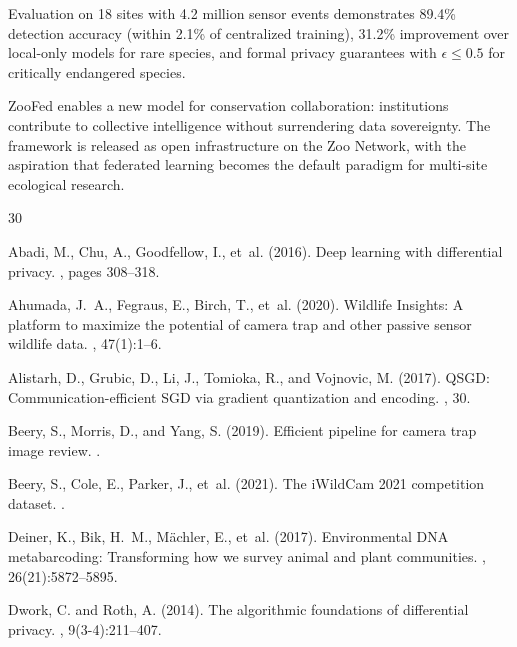 \documentclass[11pt,a4paper]{article}
\begin{document}
Evaluation on 18 sites with 4.2 million sensor events demonstrates 89.4\% detection accuracy (within 2.1\% of centralized training), 31.2\% improvement over local-only models for rare species, and formal privacy guarantees with $\epsilon \leq 0.5$ for critically endangered species.

ZooFed enables a new model for conservation collaboration: institutions contribute to collective intelligence without surrendering data sovereignty.
The framework is released as open infrastructure on the Zoo Network, with the aspiration that federated learning becomes the default paradigm for multi-site ecological research.

\begin{thebibliography}{30}

Abadi, M., Chu, A., Goodfellow, I., et~al. (2016).
\newblock Deep learning with differential privacy.
, pages 308--318.

Ahumada, J.~A., Fegraus, E., Birch, T., et~al. (2020).
\newblock Wildlife Insights: A platform to maximize the potential of camera trap and other passive sensor wildlife data.
, 47(1):1--6.

Alistarh, D., Grubic, D., Li, J., Tomioka, R., and Vojnovic, M. (2017).
\newblock QSGD: Communication-efficient SGD via gradient quantization and encoding.
, 30.

Beery, S., Morris, D., and Yang, S. (2019).
\newblock Efficient pipeline for camera trap image review.
.

Beery, S., Cole, E., Parker, J., et~al. (2021).
\newblock The iWildCam 2021 competition dataset.
.

Deiner, K., Bik, H.~M., M\"{a}chler, E., et~al. (2017).
\newblock Environmental DNA metabarcoding: Transforming how we survey animal and plant communities.
, 26(21):5872--5895.

Dwork, C. and Roth, A. (2014).
\newblock The algorithmic foundations of differential privacy.
, 9(3-4):211--407.


\end{thebibliography}
\end{document}
